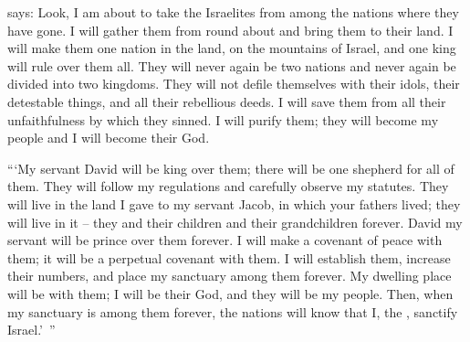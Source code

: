 {{}
says: Look,
I am
about to take
the Israelites
from among
the nations
where
they have
gone.
I will gather
them from round
about and bring
them to
their land.
I will make
them
one
nation
in the land,
on the mountains
of Israel,
and one
king
will
rule
over them all.
They will never
again be
two
nations
and never
again
be divided
into two
kingdoms.
They will not
defile
themselves with their idols,
their detestable things,
and all
their rebellious
deeds. I will save
them from all
their unfaithfulness
by which
they sinned.
I will purify
them; they will become
my people
and I
will become
their God.
\par }{\PP {}“‘My servant
David
will be king
over
them; there will be
one
shepherd
for all
of them. They will follow
my regulations
and carefully
observe
my statutes.
They will live
in the land
I gave
to my servant
Jacob,
in which
your fathers
lived;
they will live
in it
– they
and their children
and their grandchildren
forever.
David
my servant
will be prince
over
them forever.
I will make
a covenant
of peace
with them; it will be
a perpetual
covenant
with
them. I will
establish them, increase
their numbers,
and place my sanctuary
among
them forever.
My dwelling place
will be with them; I will be
their God,
and they
will be
my people.
Then, when
my sanctuary
is among
them forever,
the nations
will know
that
I,
the {},
sanctify
Israel.’ ”

\par }
